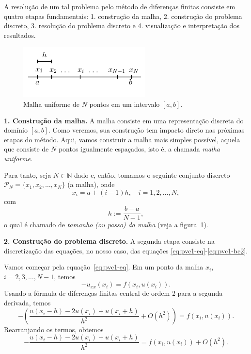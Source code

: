 A resolução de um tal problema pelo método de diferenças finitas consiste em quatro etapas fundamentais: 1. construção da malha, 2. construção do problema discreto, 3. resolução do problema discreto e 4. visualização e interpretação dos resultados. 

\begin{figure}
  \centering
  \includegraphics{./cap_pvc/pics/malha_uniforme/malha_uniforme}
  \caption{Malha uniforme de $N$ pontos em um intervalo $[a, b]$.}
  \label{fig:malha_uniforme}
\end{figure}

{\bf 1. Construção da malha.} A malha consiste em uma representação discreta do domínio $[a, b]$. Como veremos, sua construção tem impacto direto nas próximas etapas do método. Aqui, vamos construir a malha mais simples possível, aquela que consiste de $N$ pontos igualmente espaçados, isto é, a chamada \emph{malha uniforme}.

Para tanto, seja $N\in\mathbb{N}$ dado e, então, tomamos o seguinte conjunto discreto $\mathcal{P}_N = \{x_1, x_2, \dotsc, x_N\}$ (a malha), onde
\begin{equation*}
  x_i = a + (i-1)h,\quad i=1, 2, \dotsc, N,
\end{equation*}
com
\begin{equation*}
  h:=\frac{b-a}{N-1},
\end{equation*}
o qual é chamado de \emph{tamanho (ou passo) da malha} (veja a figura~\ref{fig:malha_uniforme}).

{\bf 2. Construção do problema discreto.} A segunda etapa consiste na discretização das equações, no nosso caso, das equações \eqref{eq:pvc1-eq}-\eqref{eq:pvc1-bc2}. 

Vamos começar pela equação~\eqref{eq:pvc1-eq}. Em um ponto da malha $x_i$, $i = 2, 3, \dotsc, N-1$, temos
\begin{equation*}
  -u_{xx}(x_i) = f(x_i, u(x_i)).
\end{equation*}
Usando a fórmula de diferenças finitas central de ordem 2 para a segunda derivada, temos
\begin{equation*}
  -\left(\frac{u(x_i-h) - 2u(x_i) + u(x_i+h)}{h^2} + O(h^2)\right) = f(x_i, u(x_i)).
\end{equation*}
Rearranjando os termos, obtemos
\begin{equation*}
  -\frac{u(x_i-h) - 2u(x_i) + u(x_i+h)}{h^2} = f(x_i, u(x_i)) + O(h^2). 
\end{equation*}


